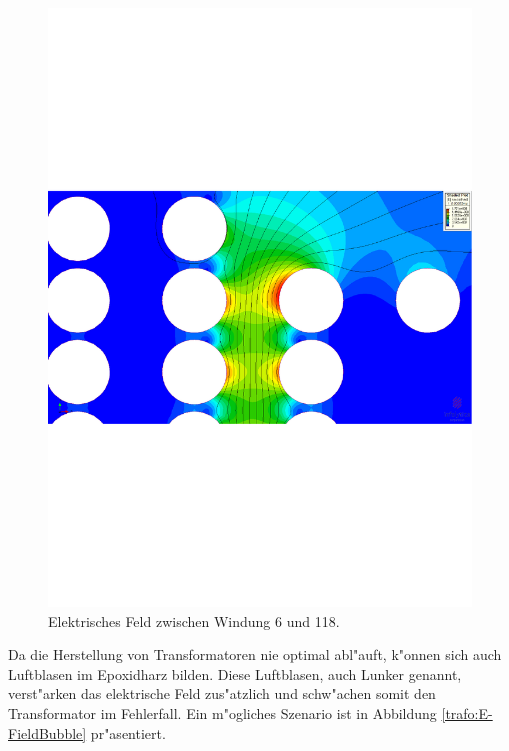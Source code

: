 \begin{refsection}
\begin{figure}
	\centering
	\includegraphics[width=\textwidth]{./trafo/images/VoltageTrans.pdf}
	\caption{Elektrisches Feld zwischen Windung 6 und 118.}
	\label{trafo:E-FieldZoom}
\end{figure}

Da die Herstellung von Transformatoren nie optimal abl"auft, k"onnen sich auch Luftblasen im Epoxidharz bilden. Diese Luftblasen, auch Lunker genannt, verst"arken das elektrische Feld zus"atzlich und schw"achen somit den Transformator im Fehlerfall. Ein m"ogliches Szenario ist in Abbildung \ref{trafo:E-FieldBubble} pr"asentiert. 


\end{refsection}
